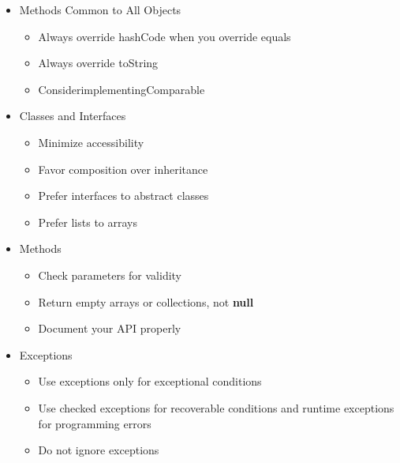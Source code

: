 \documentclass[11pt]{article}
\begin{document}
\begin{itemize}
	\item Methods Common to All Objects
		\begin{itemize}
			\item Always override hashCode when you override equals
			\item Always override toString
			\item ConsiderimplementingComparable
		\end{itemize}

	\item Classes and Interfaces
		\begin{itemize}
			\item Minimize accessibility
			\item Favor composition over inheritance
			\item Prefer interfaces to abstract classes
			\item Prefer lists to arrays
		\end{itemize}

	\item Methods
		\begin{itemize}
			\item Check parameters for validity
			\item Return empty arrays or collections, not \textbf{null}
			\item Document your API properly
		\end{itemize}

	\item Exceptions
		\begin{itemize}
			\item Use exceptions only for exceptional conditions
			\item Use checked exceptions for recoverable conditions and runtime exceptions for programming errors
			\item Do not ignore exceptions
		\end{itemize}


\end{itemize}
\end{document}
